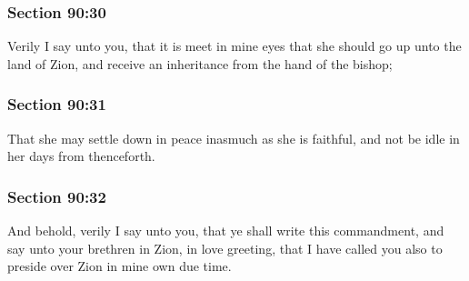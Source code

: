 	\subsubsection{Section 90:30} %
		\label{DC90-30}

		Verily I say unto you, that it is meet in mine eyes that she should go up unto the land of Zion, and receive an inheritance from the hand of the bishop;


	\subsubsection{Section 90:31} %
		\label{DC90-31}

		That she may settle down in peace inasmuch as she is faithful, and not be idle in her days from thenceforth.


	\subsubsection{Section 90:32} %
		\label{DC90-32}

		And behold, verily I say unto you, that ye shall write this commandment, and say unto your brethren in Zion, in love greeting, that I have called you also to preside over Zion in mine own due time.


